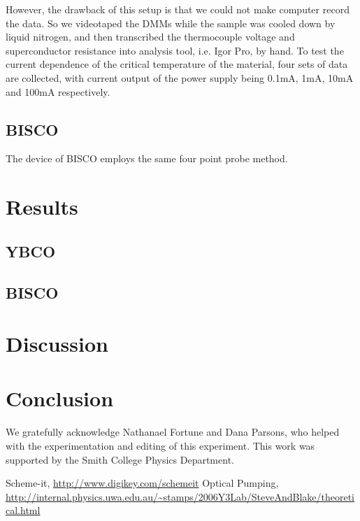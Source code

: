 \documentclass[prb,preprint]{revtex4-1}
\begin{document}
However, the drawback of this setup is that we could not make computer record the data. So we videotaped the DMMs while the sample was cooled down by liquid nitrogen, and then transcribed the thermocouple voltage and superconductor resistance into analysis tool, i.e. Igor Pro, by hand. To test the current dependence of the critical temperature of the material, four sets of data are collected, with current output of the power supply being 0.1mA, 1mA, 10mA and 100mA respectively.\\

\subsection{BISCO}

The device of BISCO employs the same four point probe method. 


\section{Results}

\subsection{YBCO}

\subsection{BISCO}



\section{Discussion}

\section{Conclusion}


\begin{acknowledgments}

We gratefully acknowledge Nathanael Fortune and Dana Parsons, who helped with the experimentation and editing of this experiment. This work was supported by the Smith College Physics Department.

\end{acknowledgments}


\begin{thebibliography}{99}

 Scheme-it, \url{http://www.digikey.com/schemeit}
 Optical Pumping, \url{http://internal.physics.uwa.edu.au/~stamps/2006Y3Lab/SteveAndBlake/theoretical.html}

\end{thebibliography}

\end{document}
